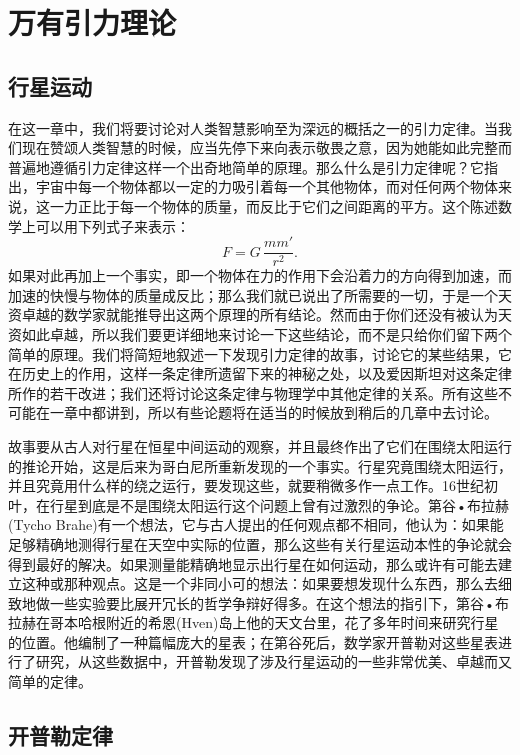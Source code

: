 \chapter{万有引力理论}

\section{行星运动}

在这一章中，我们将要讨论对人类智慧影响至为深远的概括之一的引力定律。当我们现在赞颂人类智慧的时候，应当先停下来向表示敬畏之意，因为她能如此完整而普遍地遵循引力定律这样一个出奇地简单的原理。那么什么是引力定律呢？它指出，宇宙中每一个物体都以一定的力吸引着每一个其他物体，而对任何两个物体来说，这一力正比于每一个物体的质量，而反比于它们之间距离的平方。这个陈述数学上可以用下列式子来表示：
\begin{equation*}
F=G\,\frac{mm'}{r^2}.
\end{equation*}
如果对此再加上一个事实，即一个物体在力的作用下会沿着力的方向得到加速，而加速的快慢与物体的质量成反比；那么我们就已说出了所需要的一切，于是一个天资卓越的数学家就能推导出这两个原理的所有结论。然而由于你们还没有被认为天资如此卓越，所以我们要更详细地来讨论一下这些结论，而不是只给你们留下两个简单的原理。我们将简短地叙述一下发现引力定律的故事，讨论它的某些结果，它在历史上的作用，这样一条定律所遗留下来的神秘之处，以及爱因斯坦对这条定律所作的若干改进；我们还将讨论这条定律与物理学中其他定律的关系。所有这些不可能在一章中都讲到，所以有些论题将在适当的时候放到稍后的几章中去讨论。

故事要从古人对行星在恒星中间运动的观察，并且最终作出了它们在围绕太阳运行的推论开始，这是后来为哥白尼所重新发现的一个事实。行星究竟围绕太阳运行，并且究竟用什么样的绕之运行，要发现这些，就要稍微多作一点工作。16世纪初叶，在行星到底是不是围绕太阳运行这个问题上曾有过激烈的争论。第谷•布拉赫(Tycho Brahe)有一个想法，它与古人提出的任何观点都不相同，他认为：如果能足够精确地测得行星在天空中实际的位置，那么这些有关行星运动本性的争论就会得到最好的解决。如果测量能精确地显示出行星在如何运动，那么或许有可能去建立这种或那种观点。这是一个非同小可的想法：如果要想发现什么东西，那么去细致地做一些实验要比展开冗长的哲学争辩好得多。在这个想法的指引下，第谷•布拉赫在哥本哈根附近的希恩(Hven)岛上他的天文台里，花了多年时间来研究行星的位置。他编制了一种篇幅庞大的星表；在第谷死后，数学家开普勒对这些星表进行了研究，从这些数据中，开普勒发现了涉及行星运动的一些非常优美、卓越而又简单的定律。



\section{开普勒定律}


